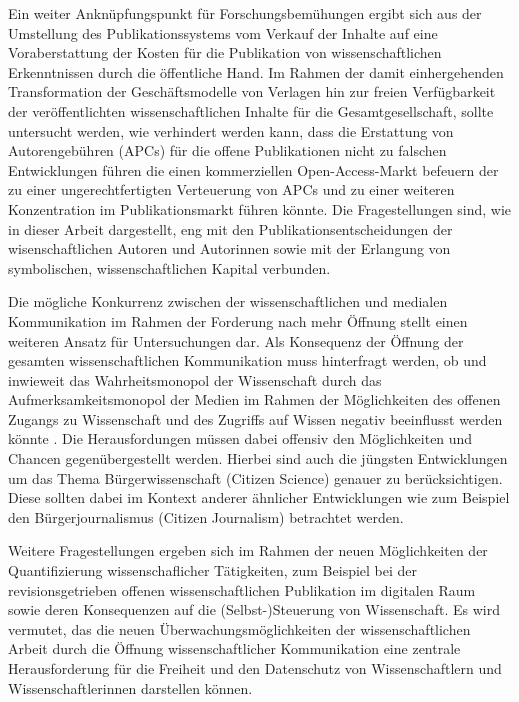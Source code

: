 Ein weiter Anknüpfungspunkt für Forschungsbemühungen ergibt sich aus der Umstellung des Publikationssystems vom Verkauf der Inhalte auf eine Voraberstattung der Kosten für die Publikation von wissenschaftlichen Erkenntnissen durch die öffentliche Hand. Im Rahmen der damit einhergehenden Transformation der Geschäftsmodelle von Verlagen hin zur freien Verfügbarkeit der veröffentlichten wissenschaftlichen Inhalte für die Gesamtgesellschaft, sollte untersucht werden, wie verhindert werden kann, dass die Erstattung von Autorengebühren (APCs) für die offene Publikationen nicht zu falschen Entwicklungen führen die einen kommerziellen Open-Access-Markt befeuern der zu einer ungerechtfertigten Verteuerung von APCs und zu einer weiteren Konzentration im Publikationsmarkt führen könnte. Die Fragestellungen sind, wie in dieser Arbeit dargestellt, eng mit den Publikationsentscheidungen der wisenschaftlichen Autoren und Autorinnen sowie mit der Erlangung von symbolischen, wissenschaftlichen Kapital verbunden.

Die mögliche Konkurrenz zwischen der wissenschaftlichen und medialen Kommunikation im Rahmen der Forderung nach mehr Öffnung stellt einen weiteren Ansatz für Untersuchungen dar. Als Konsequenz der Öffnung der gesamten wissenschaftlichen Kommunikation muss hinterfragt werden, ob und inwieweit das Wahrheitsmonopol der Wissenschaft durch das Aufmerksamkeitsmonopol der Medien im Rahmen der Möglichkeiten des offenen Zugangs zu Wissenschaft und des Zugriffs auf Wissen negativ beeinflusst werden könnte \cite{weingart_2005_wissenschaft}. Die Herausfordungen müssen dabei offensiv den Möglichkeiten und Chancen gegenübergestellt werden. Hierbei sind auch die jüngsten Entwicklungen um das Thema Bürgerwissenschaft (Citizen Science) genauer zu berücksichtigen. Diese sollten dabei im Kontext anderer ähnlicher Entwicklungen wie zum Beispiel den Bürgerjournalismus (Citizen Journalism) betrachtet werden.

Weitere Fragestellungen ergeben sich im Rahmen der neuen Möglichkeiten der Quantifizierung wissenschaflicher Tätigkeiten, zum Beispiel bei der revisionsgetrieben offenen wissenschaftlichen Publikation im digitalen Raum sowie deren Konsequenzen auf die (Selbst-)Steuerung von Wissenschaft. Es wird vermutet, das die neuen Überwachungsmöglichkeiten der wissenschaftlichen Arbeit durch die Öffnung wissenschaftlicher Kommunikation eine zentrale Herausforderung für die Freiheit und den Datenschutz von Wissenschaftlern und Wissenschaftlerinnen darstellen können.
